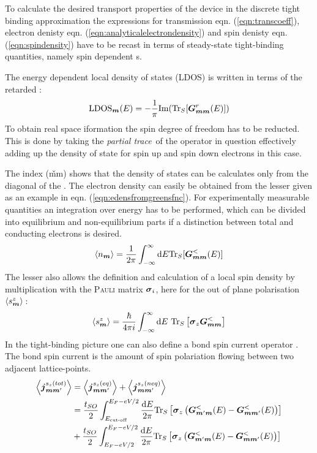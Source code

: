 To calculate the desired transport properties of the device in the discrete tight binding approximation the expressions for transmission eqn. (\ref{eqn:transcoeff}), electron denisty eqn. (\ref{eqn:analyticalelectrondensity}) and spin denisty eqn. (\ref{eqn:spindensity}) have to be recast in terms of steady-state tight-binding quantities, namely spin dependent \gfnc s.\par
The energy dependent local density of states (LDOS) is written in terms of the retarded \gfnc{}\cite{AnLunNik2008}:
\begin{align}
\text{LDOS}_{\boldsymbol{m}}(E)=-\frac{1}{\pi} \text{Im}(\text{Tr}_S[\boldsymbol{G}_{\boldsymbol{mm}}^r(E)])
\label{eqn:ldos}
\end{align}
To obtain real space iformation the spin degree of freedom has to be reducted. This is done by taking the \emph{partial trace}\,\cite{Jacobs} of the operator in question effectively adding up the density of state for spin up and spin down electrons in this case.\par
The index (\v{mm}) shows that the density of states can be calculates only from the diagonal of the \gfnc{}.
The electron density can easily be obtained from the lesser \gfnc{} given as an example in eqn. (\ref{eqn:edensfromgreensfnc}). For experimentally measurable quantities an integration over energy has to be performed, which can be divided into equilibrium and non-equilibrium parts if a distinction between total and conducting electrons is desired.
\begin{align}
	\left< n_{\boldsymbol{m}} \right> = \frac{1}{2\pi} \int_{-\infty}^{\infty}\text{d}E\text{Tr}_S[\boldsymbol{G}_{\boldsymbol{mm}}^<(E)]
\end{align}
The lesser \gfnc{} also allows the definition and calculation  of a local spin density by multiplication with the \textsc{Pauli} matrix $\boldsymbol{\sigma}_i$, here for the out of plane polarisation $\left< s^z_{\boldsymbol{m}} \right>$\,\cite{Wimmer2009Thesis}:
\begin{align}
\left< s^z_{\boldsymbol{m}} \right> = \frac{\hbar}{4 \pi i} \int^{\infty}_{-\infty}\text{d}E\text{ Tr}_S\left[\boldsymbol{\sigma}_z\boldsymbol{G}^<_{\boldsymbol{mm}}\right]
\end{align}
In the tight-binding picture one can also define a bond spin current operator \cite{EPL.80.47001}. The bond spin current is the amount of spin polariation flowing between two adjacent lattice-points.
\begin{align}
\left< \boldsymbol{j}_{\boldsymbol{m}\boldsymbol{m}'}^{s_z(tot)} \right> &=\left< \boldsymbol{j}_{\boldsymbol{m}\boldsymbol{m}'}^{s_z(eq)} \right>+ \left< \boldsymbol{j}_{\boldsymbol{m}\boldsymbol{m}'}^{s_z(neq)} \right>\\
	&=\frac{t_{SO}}{2} \int_{E_{\text{cut-off}}}^{E_F-eV/2} \frac{\text{d}E}{2 \pi} \text{Tr}_S \left[\boldsymbol{\sigma}_z\left(\boldsymbol{G}^<_{\boldsymbol{m}'\boldsymbol{m}}(E)- \boldsymbol{G}^<_{\boldsymbol{m}\boldsymbol{m}'}(E)\right)\right]\\
	&+\frac{t_{SO}}{2} \int_{E_F-eV/2}^{E_F-eV/2} \frac{\text{d}E}{2 \pi} \text{Tr}_S \left[\boldsymbol{\sigma}_z\left(\boldsymbol{G}^<_{\boldsymbol{m}'\boldsymbol{m}}(E)- \boldsymbol{G}^<_{\boldsymbol{m}\boldsymbol{m}'}(E)\right)\right]
\end{align}
